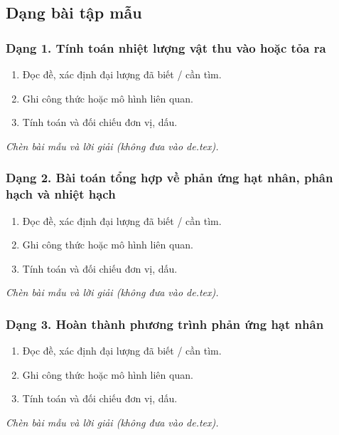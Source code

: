 

\subsection{Dạng bài tập mẫu}
\subsubsection{Dạng 1. Tính toán nhiệt lượng vật thu vào hoặc tỏa ra}
\begin{phuongphap}
\begin{enumerate}
\item Đọc đề, xác định đại lượng đã biết / cần tìm.
\item Ghi công thức hoặc mô hình liên quan.
\item Tính toán và đối chiếu đơn vị, dấu.
\end{enumerate}
\end{phuongphap}
\begin{vidumau}
\textit{Chèn bài mẫu và lời giải (không đưa vào de.tex).}
\end{vidumau}

\subsubsection{Dạng 2. Bài toán tổng hợp về phản ứng hạt nhân, phân hạch và nhiệt hạch}
\begin{phuongphap}
\begin{enumerate}
\item Đọc đề, xác định đại lượng đã biết / cần tìm.
\item Ghi công thức hoặc mô hình liên quan.
\item Tính toán và đối chiếu đơn vị, dấu.
\end{enumerate}
\end{phuongphap}
\begin{vidumau}
\textit{Chèn bài mẫu và lời giải (không đưa vào de.tex).}
\end{vidumau}

\subsubsection{Dạng 3. Hoàn thành phương trình phản ứng hạt nhân}
\begin{phuongphap}
\begin{enumerate}
\item Đọc đề, xác định đại lượng đã biết / cần tìm.
\item Ghi công thức hoặc mô hình liên quan.
\item Tính toán và đối chiếu đơn vị, dấu.
\end{enumerate}
\end{phuongphap}
\begin{vidumau}
\textit{Chèn bài mẫu và lời giải (không đưa vào de.tex).}
\end{vidumau}

